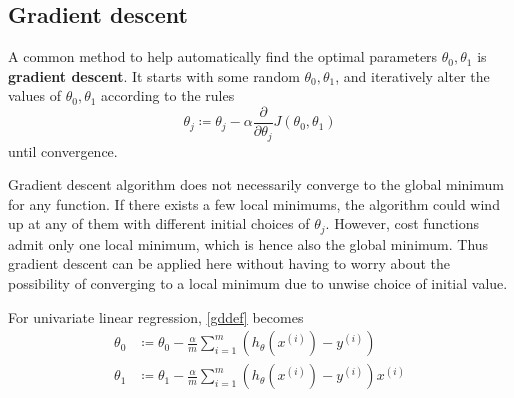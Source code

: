 \subsection{Gradient descent}
A common method to help automatically find the optimal parameters $\theta_0, \theta_1$ is {\bf gradient descent}. It starts with some random $\theta_0, \theta_1$, and iteratively alter the values of $\theta_0, \theta_1$ according to the rules
\begin{equation}\label{gddef}
\theta_j \coloneqq \theta_j - \alpha\frac{\partial}{\partial \theta_j}J(\theta_0, \theta_1)
\end{equation}
until convergence.

Gradient descent algorithm does not necessarily converge to the global minimum for any function. If there exists a few local minimums, the algorithm could wind up at any of them with different initial choices of $\theta_j$. However, cost functions admit only one local minimum, which is hence also the global minimum. Thus gradient descent can be applied here without having to worry about the possibility of converging to a local minimum due to unwise choice of initial value.

For univariate linear regression, \eqref{gddef} becomes
\begin{equation}
\begin{split}
\theta_0 &\coloneqq \theta_0 - \frac{\alpha}{m}\sum\limits_{i=1}^m\left(h_{\theta}(x^{(i)}) - y^{(i)}\right)\\
\theta_1 &\coloneqq \theta_1 - \frac{\alpha}{m}\sum\limits_{i=1}^m\left(h_{\theta}(x^{(i)}) - y^{(i)}\right)x^{(i)}
\end{split}
\end{equation}
\ifx\PREAMBLE\undefined

\fi